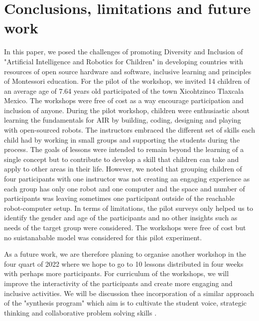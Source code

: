 \documentclass[conference]{IEEEtran}
\begin{document}
\section{Conclusions, limitations and future work}
In this paper, we posed the challenges of promoting Diversity and Inclusion of "Artificial Intelligence and Robotics for Children" in developing countries with resources of open source hardware and software, inclusive learning and principles of Montessori education. 
For the pilot of the workshop, we invited 14 children of an average age of 7.64 years old participated of the town Xicohtzinco Tlaxcala Mexico.
The workshops were free of cost as a way encourage participation and inclusion of anyone. 
During the pilot workshop, children were enthusiastic about learning the fundamentals for AIR by building, coding, designing and playing with open-sourced robots. 
The instructors embraced the different set of skills each child had by working in small groups and supporting the students during the process. 
The goals of lessons were intended to remain beyond the learning of a single concept but to contribute to develop a skill that children can take and apply to other areas in their life.
However, we noted that grouping children of four participants with one instructor was not creating an engaging experience as each group has only one robot and one computer and the space and number of participants was leaving sometimes one participant outside of the reachable robot-computer setup.
In terms of limitations, the pilot surveys only helped us to identify the gender and age of the participants and no other insights such as needs of the target group were considered.
The workshops were free of cost but no suistanabable model was considered for this pilot experiment.

As a future work, we are therefore planing to organise another workshop in the four quart of 2022 where we hope to go to 10 lessons distributed in four weeks with perhaps more participants.
For curriculum of the workshops, we will improve the interactivity of the participants and create more engaging and inclusive activities. 
We will be discussion thee incorporation of a similar approach of the "synthesis program" which aim is to cultivate the student voice, strategic thinking and collaborative problem solving skills \cite{synthesis2022}.
\end{document}
